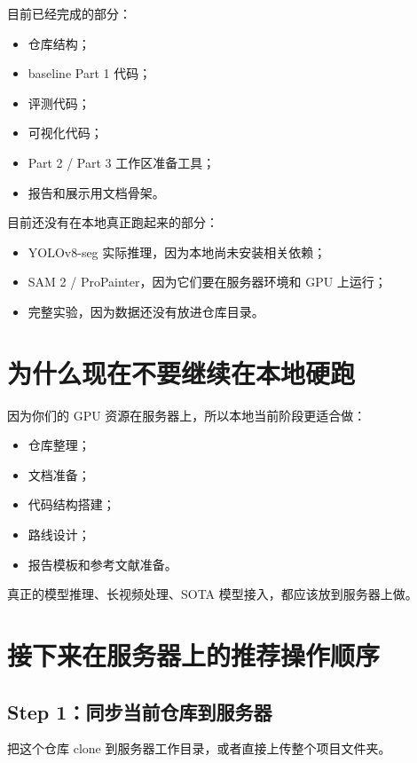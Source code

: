 \documentclass[11pt,a4paper,fontset=none]{ctexart}
\begin{document}
目前已经完成的部分：

\begin{itemize}
  \item 仓库结构；
  \item baseline Part 1 代码；
  \item 评测代码；
  \item 可视化代码；
  \item Part 2 / Part 3 工作区准备工具；
  \item 报告和展示用文档骨架。
\end{itemize}

目前还没有在本地真正跑起来的部分：

\begin{itemize}
  \item YOLOv8-seg 实际推理，因为本地尚未安装相关依赖；
  \item SAM 2 / ProPainter，因为它们要在服务器环境和 GPU 上运行；
  \item 完整实验，因为数据还没有放进仓库目录。
\end{itemize}

\section{为什么现在不要继续在本地硬跑}

因为你们的 GPU 资源在服务器上，所以本地当前阶段更适合做：

\begin{itemize}
  \item 仓库整理；
  \item 文档准备；
  \item 代码结构搭建；
  \item 路线设计；
  \item 报告模板和参考文献准备。
\end{itemize}

真正的模型推理、长视频处理、SOTA 模型接入，都应该放到服务器上做。

\section{接下来在服务器上的推荐操作顺序}

\subsection*{Step 1：同步当前仓库到服务器}

把这个仓库 clone 到服务器工作目录，或者直接上传整个项目文件夹。
\end{document}

